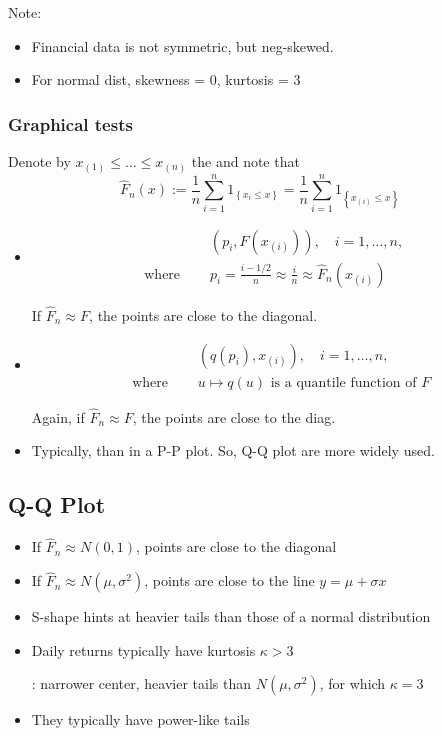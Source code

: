 Note:
\begin{itemize}[leftmargin=*]
    \item Financial data is not symmetric, but neg-skewed.
    \item For normal dist, skewness = 0, kurtosis = 3
\end{itemize}





\subsubsection*{Graphical tests}
Denote by $x_{(1)} \leq \ldots \leq x_{(n)}$ the  and note that
$$
\hat{F}_{n}(x):=\frac{1}{n} \sum_{i=1}^{n} 1_{\left\{x_{i} \leq x\right\}}=\frac{1}{n} \sum_{i=1}^{n} 1_{\left\{x_{(i)} \leq x\right\}}
$$
\begin{itemize}[leftmargin=*]
    \item {}
$$
\begin{aligned}
    &\left(p_{i}, F\left(x_{(i)}\right)\right), \quad i=1, \ldots, n, \\
    \text { where } \quad &p_{i}=\frac{i-1 / 2}{n} \approx \frac{i}{n} \approx \hat{F}_{n}\left(x_{(i)}\right)
\end{aligned}
$$

If $\hat{F}_{n} \approx F$, the points are close to the diagonal.
    \item {}
$$
\begin{aligned}
    &\left(q\left(p_{i}\right), x_{(i)}\right), \quad i=1, \ldots, n, \\
    \quad \text { where } \quad &u \mapsto q(u) \text { is a quantile function of } F
\end{aligned}
$$

Again, if $\hat{F}_{n} \approx F$, the points are close to the diag.
    \item Typically,  than in a P-P plot. So, Q-Q plot are more widely used.
\end{itemize}



\subsection*{Q-Q Plot}
    \begin{itemize}[leftmargin=*]
    \item If $\hat{F}_{n} \approx N(0,1)$, points are close to the diagonal
    \item If $\hat{F}_{n} \approx N\left(\mu, \sigma^{2}\right)$, points are close to the line $y=\mu+\sigma x$
    \item S-shape hints at heavier tails than those of a normal distribution
    \item Daily returns typically have kurtosis $\kappa>3$
    
: narrower center, heavier tails than $N\left(\mu, \sigma^{2}\right)$, for which $\kappa=3$
    \item They typically have power-like tails
\end{itemize}




